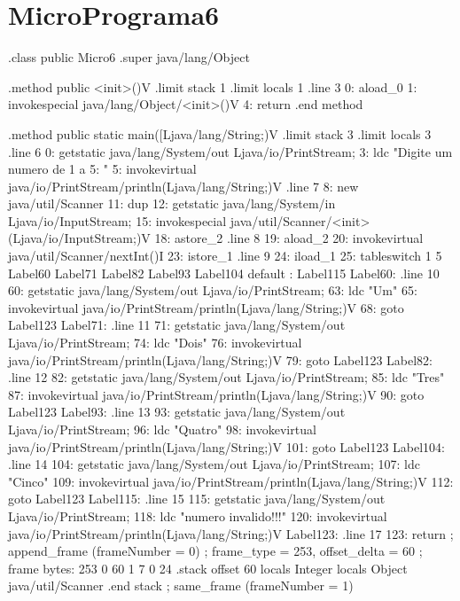 \documentclass[12pt,a4paper,twoside]{report}
\begin{document}
\section{MicroPrograma6}
\begin{terminal}
.class public Micro6
.super java/lang/Object

.method public <init>()V
  .limit stack 1
  .limit locals 1
  .line 3
  0: aload_0
  1: invokespecial java/lang/Object/<init>()V
  4: return
.end method

.method public static main([Ljava/lang/String;)V
  .limit stack 3
  .limit locals 3
  .line 6
  0: getstatic java/lang/System/out Ljava/io/PrintStream;
  3: ldc "Digite um numero de 1 a 5: "
  5: invokevirtual java/io/PrintStream/println(Ljava/lang/String;)V
  .line 7
  8: new java/util/Scanner
  11: dup
  12: getstatic java/lang/System/in Ljava/io/InputStream;
  15: invokespecial java/util/Scanner/<init>(Ljava/io/InputStream;)V
  18: astore_2
  .line 8
  19: aload_2
  20: invokevirtual java/util/Scanner/nextInt()I
  23: istore_1
  .line 9
  24: iload_1
  25: tableswitch 1 5
          Label60
          Label71
          Label82
          Label93
          Label104
          default : Label115
Label60:
  .line 10
  60: getstatic java/lang/System/out Ljava/io/PrintStream;
  63: ldc "Um"
  65: invokevirtual java/io/PrintStream/println(Ljava/lang/String;)V
  68: goto Label123
Label71:
  .line 11
  71: getstatic java/lang/System/out Ljava/io/PrintStream;
  74: ldc "Dois"
  76: invokevirtual java/io/PrintStream/println(Ljava/lang/String;)V
  79: goto Label123
Label82:
  .line 12
  82: getstatic java/lang/System/out Ljava/io/PrintStream;
  85: ldc "Tres"
  87: invokevirtual java/io/PrintStream/println(Ljava/lang/String;)V
  90: goto Label123
Label93:
  .line 13
  93: getstatic java/lang/System/out Ljava/io/PrintStream;
  96: ldc "Quatro"
  98: invokevirtual java/io/PrintStream/println(Ljava/lang/String;)V
  101: goto Label123
Label104:
  .line 14
  104: getstatic java/lang/System/out Ljava/io/PrintStream;
  107: ldc "Cinco"
  109: invokevirtual java/io/PrintStream/println(Ljava/lang/String;)V
  112: goto Label123
Label115:
  .line 15
  115: getstatic java/lang/System/out Ljava/io/PrintStream;
  118: ldc "numero invalido!!!"
  120: invokevirtual java/io/PrintStream/println(Ljava/lang/String;)V
Label123:
  .line 17
  123: return
  ; append_frame (frameNumber = 0)
  ; frame_type = 253, offset_delta = 60
  ; frame bytes: 253 0 60 1 7 0 24
  .stack
    offset 60
    locals Integer
    locals Object java/util/Scanner
    .end stack
  ; same_frame (frameNumber = 1)

\end{terminal}
\end{document}
